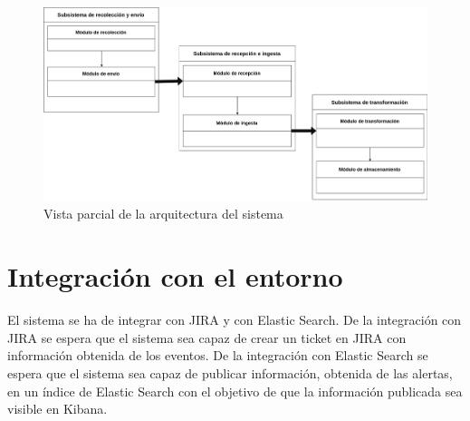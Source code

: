 \begin{figure}[!htb]
	
	\includegraphics[width=\linewidth] {Moduloss-arquitecturaparcial.png}
	\caption{Vista parcial de la arquitectura del sistema}
	\label{fig:arqparcial}
\end{figure}

\section{Integración con el entorno}
El sistema se ha de integrar con JIRA y con Elastic Search. De la integración con JIRA se espera que el sistema sea capaz de crear un ticket en JIRA con información obtenida de los eventos. De la integración con Elastic Search se espera que el sistema sea capaz de publicar información, obtenida de las alertas, en un índice de Elastic Search con el objetivo de que la información publicada sea visible en Kibana.
